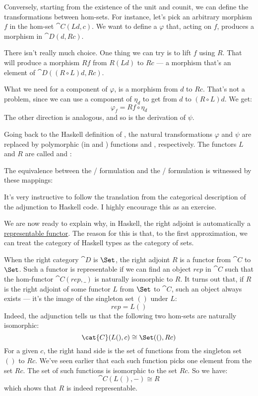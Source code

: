 Conversely, starting from the existence of the unit and counit, we can
define the transformations between hom-sets. For instance, let's pick an
arbitrary morphism $f$ in the hom-set $\cat{C}(L d, c)$. We
want to define a $\varphi$ that, acting on $f$, produces a
morphism in $\cat{D}(d, R c)$.

There isn't really much choice. One thing we can try is to lift
$f$ using $R$. That will produce a morphism $R f$
from $R (L d)$ to $R c$ --- a morphism that's an
element of $\cat{D}((R \circ L) d, R c)$.

What we need for a component of $\varphi$, is a morphism from
$d$ to $R c$. That's not a problem, since we can use a
component of $\eta_d$ to get from $d$ to
$(R \circ L) d$. We get:
\[\varphi_f = R f \circ \eta_d\]
The other direction is analogous, and so is the derivation of $\psi$.

Going back to the Haskell definition of , the natural
transformations $\varphi$ and $\psi$ are replaced by polymorphic
(in  and ) functions  and
, respectively. The functors $L$ and
$R$ are called  and :

The equivalence between the / formulation
and the /\allowbreak{} formulation is
witnessed by these mappings:

It's very instructive to follow the translation from the categorical
description of the adjunction to Haskell code. I highly encourage this
as an exercise.

We are now ready to explain why, in Haskell, the right adjoint is
automatically a \hyperref[representable-functors]{representable
  functor}. The reason for this is that, to the first approximation, we
can treat the category of Haskell types as the category of sets.

When the right category $\cat{D}$ is $\Set$, the right adjoint
$R$ is a functor from $\cat{C}$ to $\Set$. Such a functor is
representable if we can find an object $\mathit{rep}$ in $\cat{C}$ such
that the hom-functor $\cat{C}(\mathit{rep}, \_)$ is naturally isomorphic to
$R$. It turns out that, if $R$ is the right adjoint of
some functor $L$ from $\Set$ to $\cat{C}$, such an object
always exists --- it's the image of the singleton set $()$ under
$L$:
\[\mathit{rep} = L ()\]
Indeed, the adjunction tells us that the following two hom-sets are
naturally isomorphic:
\[\cat{C}(L (), c) \cong \Set((), R c)\]
For a given $c$, the right hand side is the set of functions from
the singleton set $()$ to $R c$. We've seen earlier that
each such function picks one element from the set $R c$. The set
of such functions is isomorphic to the set $R c$. So we have:
\[\cat{C}(L (), -) \cong R\]
which shows that $R$ is indeed representable.

